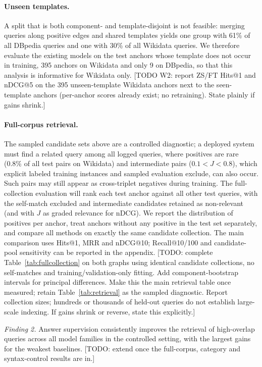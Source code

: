 \documentclass[runningheads]{llncs}
\newcommand{\hp}[1]{{\color{red!75!black}#1}}
\begin{document}
\paragraph{Unseen templates.}
A split that is both component- and template-disjoint is not feasible: merging
queries along positive edges and shared templates yields one group with 61\%
of all DBpedia queries and one with 30\% of all Wikidata queries. We therefore
evaluate the existing models on the test anchors whose template does not occur
in training, 395 anchors on Wikidata and only 9 on DBpedia, so that this
analysis is informative for Wikidata only.
\hp{[TODO W2: report ZS/FT Hits@1 and nDCG@5 on the 395 unseen-template Wikidata
anchors next to the seen-template anchors (per-anchor scores already exist; no
retraining). State plainly if gains shrink.]}

\paragraph{Full-corpus retrieval.}
The sampled candidate sets above are a controlled diagnostic; a deployed
system must find a related query among all logged queries, where positives are
rare (0.8\% of all test pairs on Wikidata) and intermediate pairs
($0.1 < J < 0.8$), which explicit labeled training instances and sampled
evaluation exclude, can also occur. Such pairs may still appear as
cross-triplet negatives during training. The full-collection evaluation
will rank each test anchor against all other test queries, with the
self-match excluded and intermediate candidates retained as non-relevant (and
with $J$ as graded relevance for nDCG). We report the distribution of
positives per anchor, treat anchors without any positive in the test set
separately, and compare all methods on exactly the same candidate collection.
The main comparison uses Hits@1, MRR and nDCG@10; Recall@10/100 and
candidate-pool sensitivity can be reported in the appendix.
\hp{[TODO: complete Table~\ref{tab:fullcollection} on both graphs using
identical candidate collections, no self-matches and training/validation-only
fitting. Add component-bootstrap intervals for principal differences. Make
this the main retrieval table once measured; retain Table~\ref{tab:retrieval}
as the sampled diagnostic. Report collection sizes; hundreds or thousands
of held-out queries do not establish large-scale indexing. If gains shrink
or reverse, state this explicitly.]}


\textit{Finding 2.} Answer supervision consistently improves the
retrieval of high-overlap queries across all model families in the controlled
setting, with the largest gains for the weakest baselines.
\hp{[TODO: extend once the full-corpus, category and syntax-control results
are in.]}
\end{document}
